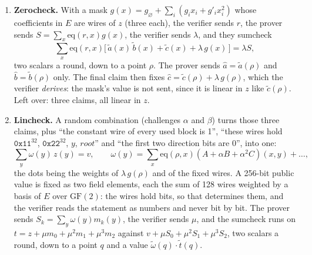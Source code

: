 \documentclass[11pt]{article}
\newcommand{\E}{E}
\newcommand{\eq}{\mathrm{eq}}
\newcommand{\mle}[1]{\widetilde{#1}}
\newcommand{\rootnode}{\mathit{root}}
\newcommand{\comb}{\omega}
\begin{document}
\begin{enumerate}[leftmargin=*,itemsep=0.5em]
  \item \textbf{Zerocheck.} With a mask $g(x) = g_\varnothing + \sum_i (g_i x_i + g'_i x_i^2)$ whose coefficients in $\E$ are wires of $z$ (three each), the verifier sends $r$, the prover sends $S = \sum_x \eq(r,x) g(x)$, the verifier sends $\lambda$, and they sumcheck
  \[
    \sum_{x} \eq(r, x) \bigl[\, \mle a(x)\, \mle b(x) + \mle c(x) + \lambda\, g(x) \,\bigr] = \lambda S ,
  \]
  two scalars a round, down to a point $\rho$. The prover sends $\hat a = \mle a(\rho)$ and $\hat b = \mle b(\rho)$ only. The final claim then fixes $\hat c = \mle c(\rho) + \lambda\, g(\rho)$, which the verifier \emph{derives}: the mask's value is not sent, since it is linear in $z$ like $\mle c(\rho)$. Left over: three claims, all linear in $z$.

  \item \textbf{Lincheck.} A random combination (challenges $\alpha$ and $\beta$) turns those three claims, plus ``the constant wire of every used block is 1'', ``these wires hold $\mathtt{0x11}^{32}$, $\mathtt{0x22}^{32}$, $y$, $\rootnode$'' and ``the first two direction bits are 0'', into one:
  \[
    \sum_{y} \comb(y)\, z(y) = v, \qquad \comb(y) = \sum_x \eq(\rho, x) (A + \alpha B + \alpha^2 C)(x, y) + \dots,
  \]
  the dots being the weights of $\lambda\, g(\rho)$ and of the fixed wires. A 256-bit public value is fixed as two field elements, each the sum of 128 wires weighted by a basis of $\E$ over $\mathrm{GF}(2)$: the wires hold bits, so that determines them, and the verifier reads the statement as numbers and never bit by bit.
  The prover sends $S_k = \sum_y \comb(y) m_k(y)$, the verifier sends $\mu$, and the sumcheck runs on $t = z + \mu m_0 + \mu^2 m_1 + \mu^3 m_2$ against $v + \mu S_0 + \mu^2 S_1 + \mu^3 S_2$, two scalars a round, down to a point $q$ and a value $\mle\comb(q) \cdot \mle t(q)$.


\end{enumerate}
\end{document}

